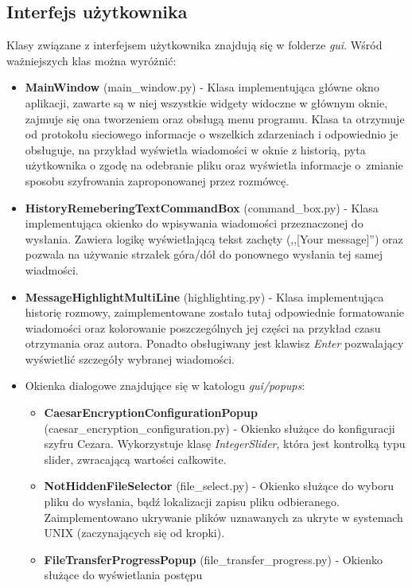 \documentclass{article}
\begin{document}
  \subsection{Interfejs użytkownika}
  Klasy związane z interfejsem użytkownika znajdują się w folderze \emph{gui}. Wśród ważniejszych klas można wyróżnić:
  \begin{itemize}
      \item {\bfseries MainWindow} (main\_window.py) - Klasa implementująca główne okno aplikacji, zawarte są w niej
          wszystkie widgety widoczne w głównym oknie, zajmuje się ona tworzeniem oraz obsługą menu programu. Klasa ta
          otrzymuje od protokołu sieciowego informacje o wszelkich zdarzeniach i odpowiednio je obsługuje, na przykład
          wyświetla wiadomości w oknie z historią, pyta użytkownika o zgodę na odebranie pliku oraz wyświetla informacje
          o~zmianie sposobu szyfrowania zaproponowanej przez rozmówcę.
      \item {\bfseries HistoryRemeberingTextCommandBox} (command\_box.py) - Klasa implementująca okienko do wpisywania
          wiadomości przeznaczonej do wysłania. Zawiera logikę wyświetlającą tekst zachęty (,,[Your message]'') oraz
          pozwala na używanie strzałek góra/dół do ponownego wysłania tej samej wiadmości.
      \item {\bfseries MessageHighlightMultiLine} (highlighting.py) - Klasa implementująca historię rozmowy,
          zaimplementowane zostało tutaj odpowiednie formatowanie wiadomości oraz kolorowanie poszczególnych jej części
          na przykład czasu otrzymania oraz autora. Ponadto obsługiwany jest klawisz \emph{Enter} pozwalający wyświetlić
          szczegóły wybranej wiadomości.
      \item Okienka dialogowe znajdujące się w katologu \emph{gui/popups}:
      \begin{itemize}
          \item {\bfseries CaesarEncryptionConfigurationPopup} (caesar\_encryption\_configuration.py) - Okienko służące
              do konfiguracji szyfru Cezara. Wykorzystuje klasę \emph{IntegerSlider}, która jest kontrolką typu slider,
              zwracającą wartości całkowite.
          \item {\bfseries NotHiddenFileSelector} (file\_select.py) - Okienko służące do wyboru pliku do wysłania, bądź
              lokalizacji zapisu pliku odbieranego. Zaimplementowano ukrywanie plików uznawanych za ukryte w systemach
              UNIX (zaczynających się od kropki).
          \item {\bfseries FileTransferProgressPopup} (file\_transfer\_progress.py) - Okienko służące do wyświetlania postępu

\end{itemize}
\end{itemize}
\end{document}
